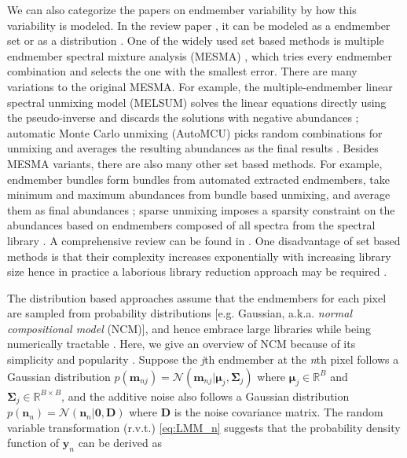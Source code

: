 \documentclass[twocolumn,english]{IEEEtran}
\theoremstyle{plain}
\begin{document}
We can also categorize the papers on endmember variability by how
this variability is modeled. In the review paper \cite{zare2014endmember},
it can be modeled as a endmember set \cite{bateson2000endmember,roberts1998mapping}
or as a distribution \cite{zhangpso,eches2010estimating,song2005spectral}.
One of the widely used set based methods is multiple endmember spectral
mixture analysis (MESMA) \cite{roberts1998mapping}, which tries every
endmember combination and selects the one with the smallest error.
There are many variations to the original MESMA. For example, the
multiple-endmember linear spectral unmixing model (MELSUM) solves
the linear equations directly using the pseudo-inverse and discards
the solutions with negative abundances \cite{combe2008analysis};
automatic Monte Carlo unmixing (AutoMCU) picks random combinations
for unmixing and averages the resulting abundances as the final results
\cite{asner2000biogeophysical,asner2002spectral}. Besides MESMA variants,
there are also many other set based methods. For example, endmember
bundles form bundles from automated extracted endmembers, take minimum
and maximum abundances from bundle based unmixing, and average them
as final abundances \cite{bateson2000endmember}; sparse unmixing
imposes a sparsity constraint on the abundances based on endmembers
composed of all spectra from the spectral library \cite{castrodad2011learning}.
A comprehensive review can be found in \cite{somers2011endmember,zare2014endmember}.
One disadvantage of set based methods is that their complexity increases
exponentially with increasing library size hence in practice a laborious
library reduction approach may be required \cite{wetherley2017mapping}. 

The distribution based approaches assume that the endmembers for each
pixel are sampled from probability distributions {[}e.g. Gaussian,
a.k.a. \emph{normal compositional model} (NCM){]}, and hence embrace
large libraries while being numerically tractable \cite{du2014spatial,stein2003application}.
Here, we give an overview of NCM because of its simplicity and popularity
\cite{eches2010bayesian,halimi2015unsupervised,zare2010pce}. Suppose
the \emph{j}th endmember at the \emph{n}th pixel follows a Gaussian
distribution $p\left(\mathbf{m}_{nj}\right)=\mathcal{N}\left(\mathbf{m}_{nj}\vert\boldsymbol{\mu}_{j},\boldsymbol{\Sigma}_{j}\right)$
where $\boldsymbol{\mu}_{j}\in\mathbb{R}^{B}$ and $\boldsymbol{\Sigma}_{j}\in\mathbb{R}^{B\times B}$,
and the additive noise also follows a Gaussian distribution $p\left(\mathbf{n}_{n}\right)=\mathcal{N}\left(\mathbf{n}_{n}|\mathbf{0},\mathbf{D}\right)$
where $\mathbf{D}$ is the noise covariance matrix. The random variable
transformation (r.v.t.) \eqref{eq:LMM_n} suggests that the probability
density function of $\mathbf{y}_{n}$ can be derived as
\end{document}
